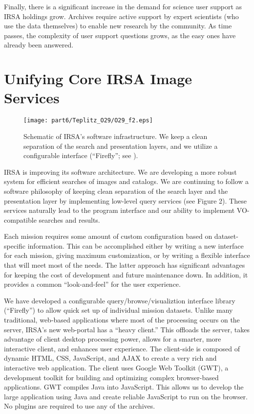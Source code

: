 Finally, there is a significant increase in the demand for science user support as IRSA holdings grow.  Archives require active support by expert scientists (who use the data themselves) to enable new research by the community.  As time passes, the complexity of user support questions grows, as the easy ones have already been answered.


\section{Unifying Core IRSA Image Services}

\begin{figure}[t]

\centering
\texttt{[image: part6/Teplitz\_O29/O29\_f2.eps]}
\caption{Schematic of IRSA's software infrastructure. We keep a clean separation of the search and presentation layers, and we utilize a configurable interface (``Firefly''; see \citet{roby_XXII}).}

\end{figure}

IRSA is improving its software architecture. We are developing a more robust system for efficient searches of images and catalogs. We are continuing to follow a software philosophy of keeping clean separation of the search layer and the presentation layer by implementing low-level query services (see Figure 2). These services naturally lead to the program interface and our ability to implement VO-compatible searches and results.

Each mission requires some amount of custom configuration based on dataset-specific information.  This can be accomplished either by writing a new interface for each mission, giving maximum customization, or by writing a flexible interface that will meet most of the needs.  The latter approach has significant advantages for keeping the cost of development and future maintenance down.  In addition, it provides a common ``look-and-feel'' for the user experience.

We have developed a configurable query/browse/visualiztion interface library (``Firefly'') to allow quick set up of individual mission datasets.  Unlike many traditional, web-based applications where most of the processing occurs on the server, IRSA’s new web-portal has a “heavy client.” This offloads the server, takes advantage of client desktop processing power, allows for a smarter, more interactive client, and enhances user experience. The client-side is composed of dynamic HTML, CSS, JavaScript, and AJAX to create a very rich and interactive web application. The client uses Google Web Toolkit (GWT), a development toolkit for building and optimizing complex browser-based applications. GWT compiles Java into JavaScript. This allows us to develop the large application using Java and create reliable JavaScript to run on the browser. No plugins are required to use any of the archives.  

